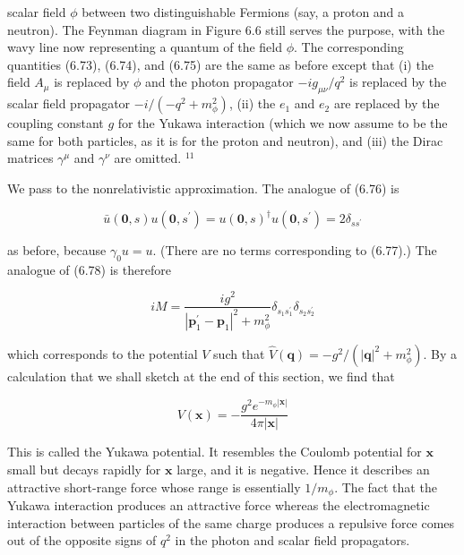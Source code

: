 \documentclass[10pt, letterpaper]{article}
\begin{document}
scalar field $\phi$ between two distinguishable Fermions (say, a proton and a neutron). The Feynman diagram in Figure 6.6 still serves the purpose, with the wavy line now representing a quantum of the field $\phi$. The corresponding quantities (6.73), (6.74), and (6.75) are the same as before except that (i) the field $A_{\mu}$ is replaced by $\phi$ and the photon propagator $-i g_{\mu \nu} / q^{2}$ is replaced by the scalar field propagator $-i /\left(-q^{2}+m_{\phi}^{2}\right)$, (ii) the $e_{1}$ and $e_{2}$ are replaced by the coupling constant $g$ for the Yukawa interaction (which we now assume to be the same for both particles, as it is for the proton and neutron), and (iii) the Dirac matrices $\gamma^{\mu}$ and $\gamma^{\nu}$ are omitted. ${ }^{11}$

We pass to the nonrelativistic approximation. The analogue of (6.76) is

$$
\bar{u}(\mathbf{0}, s) u\left(\mathbf{0}, s^{\prime}\right)=u(\mathbf{0}, s)^{\dagger} u\left(\mathbf{0}, s^{\prime}\right)=2 \delta_{s s^{\prime}}
$$

as before, because $\gamma_{0} u=u$. (There are no terms corresponding to (6.77).) The analogue of (6.78) is therefore

$$
i M=\frac{i g^{2}}{\left|\mathbf{p}_{1}^{\prime}-\mathbf{p}_{1}\right|^{2}+m_{\phi}^{2}} \delta_{s_{1} s_{1}^{\prime}} \delta_{s_{2} s_{2}^{\prime}}
$$

which corresponds to the potential $V$ such that $\widehat{V}(\mathbf{q})=-g^{2} /\left(|\mathbf{q}|^{2}+m_{\phi}^{2}\right)$. By a calculation that we shall sketch at the end of this section, we find that

$$
V(\mathbf{x})=-\frac{g^{2} e^{-m_{\phi}|\mathbf{x}|}}{4 \pi|\mathbf{x}|}
$$

This is called the Yukawa potential. It resembles the Coulomb potential for $\mathbf{x}$ small but decays rapidly for $\mathbf{x}$ large, and it is negative. Hence it describes an attractive short-range force whose range is essentially $1 / m_{\phi}$. The fact that the Yukawa interaction produces an attractive force whereas the electromagnetic interaction between particles of the same charge produces a repulsive force comes out of the opposite signs of $q^{2}$ in the photon and scalar field propagators.
\end{document}
